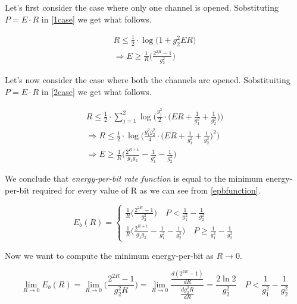Let's first consider the case where only one channel is opened. Sobstituting $P=E \cdot R$ in \eqref{1case} we get what follows.

\begin{equation}
	\begin{gathered}
		R \leq \frac{1}{2} \cdot \log\big( 1 + g_2^2 E R \big) \\
		\Rightarrow E \geq \frac{1}{R}\Big(\frac{2^{2R}-1}{g_2^2}\Big)
	\end{gathered}
\end{equation}

Let's now consider the case where both the channels are opened. Sobstituiting $P=E \cdot R$ in \eqref{2case} we get what follows.

\begin{equation}
	\begin{gathered}
		R \leq \frac{1}{2} \cdot \sum_{j=1}^2 \log\Big(\frac{g_j^2}{2} \cdot \Big(ER+\frac{1}{g_1^2} + \frac{1}{g_2^2}\Big)\Big) \\
		\Rightarrow R \leq \frac{1}{2} \cdot \log\Big(\frac{g_1^2 g_2^2}{4} \cdot \Big(ER+\frac{1}{g_1^2} + \frac{1}{g_2^2}\Big)^2\Big) \\
		\Rightarrow E \geq \frac{1}{R} \Big(\frac{2^{R+1}}{g_1g_2} -\frac{1}{g_1^2} - \frac{1}{g_2^2} \Big)
	\end{gathered}
\end{equation}

We conclude that \textit{energy-per-bit rate function} is equal to the minimum energy-per-bit required for every value of R as we can see from \eqref{epbfunction}.

\begin{equation} E_b(R)=
	\begin{cases}
		\frac{1}{R}\Big(\frac{2^{2R}-1}{g_2^2}\Big) \quad P < \frac{1}{g_1^2} - \frac{1}{g_2^2}  \\
		\frac{1}{R} \Big(\frac{2^{R+1}}{g_1g_2} -\frac{1}{g_1^2} - \frac{1}{g_2^2} \Big)  \quad P \geq \frac{1}{g_1^2} - \frac{1}{g_2^2}
	\end{cases}
	\label{epbfunction}
\end{equation}

Now we want to compute the minimum energy-per-bit as $R \rightarrow 0$.


\begin{equation}
	\lim_{R \rightarrow 0} E_b(R) =
		\lim_{R \rightarrow 0} \Big(\frac{2^{2R}-1}{g_2^2 R}\Big) = \lim_{R \rightarrow 0} \frac{ \frac{d(2^{2R}-1)}{dR}} {\frac{dg_2^2 R}{dR}}=\frac{2\ln{2}}{g_2^2} \quad P < \frac{1}{g_1^2} - \frac{1}{g_2^2}
\end{equation}

